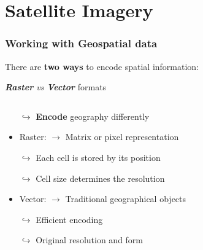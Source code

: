 \documentclass[xcolor=x11names,aspectratio=169, compress]{beamer}
\renewcommand{\(}{\begin{columns}}
\renewcommand{\)}{\end{columns}}
\newcommand{\<}[1]{\begin{column}{#1}}
\renewcommand{\>}{\end{column}}
\begin{document}
\section{Satellite Imagery }

\begin{frame}
    \frametitle{Working with Geospatial data  }
There are \textbf{two ways} to encode spatial information:\\
\begin{center} \emph{\textbf{Raster} vs \textbf{Vector}} formats  \end{center}
\pause
    \begin{columns}[T]
        \begin{column}{0.6\textwidth}
            \begin{itemize}[<+->]
            \item[$\hookrightarrow$] \textbf{Encode} geography differently
             \item Raster: $\rightarrow $  Matrix or pixel representation
             \item[$\hookrightarrow$] Each cell is stored by its position
             \item[$\hookrightarrow$] Cell size determines the resolution
             \item Vector:  $\rightarrow $  Traditional geographical objects
             \item[$\hookrightarrow$] Efficient encoding
             \item[$\hookrightarrow$] Original resolution and form
            \end{itemize}
        \end{column}
        \begin{column}{0.4\textwidth}
        \begin{itemize}
             \item[]

\end{itemize}
\end{column}
\end{columns}
\end{frame}
\end{document}

